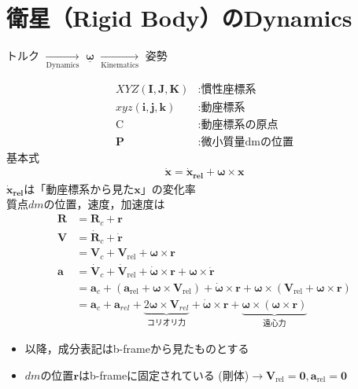 \documentclass[class=article, crop=false, dvipdfmx, fleqn]{standalone}
\begin{document}
\section{衛星（Rigid Body）のDynamics}
\begin{center}
トルク
$\xrightarrow[\text{Dynamics}]{}$
$\underline{\bm{\omega}}$
$\xrightarrow[\text{Kinematics}]{}$
姿勢
\end{center}



\begin{align}
XYZ\left(\bm{I},\bm{J},\bm{K}\right)&:
\text{慣性座標系}\\
xyz\left(\bm{i},\bm{j},\bm{k}\right)&:
\text{動座標系}\\
\text{C}&:
\text{動座標系の原点}\\
\bm{P}&:
\text{微小質量dmの位置}
\end{align}
基本式
\begin{align}
\bm{\dot{x}} = 
\bm{\dot{x}_{rel}} + 
\bm{\omega}\times\bm{x}
\end{align}
$\bm{\dot{x}_{rel}}$は「動座標系から見た$\bm{x}$」の変化率\\
質点$dm$の位置，速度，加速度は
\begin{align}
\bm{R}&=
\bm{R}_c+\bm{r}\\
\bm{V}&=
\dot{\bm{R}}_c+\dot{\bm{r}}\\
&=
\bm{V}_c+\bm{V}_\mathrm{rel}+
\bm{\omega}\times\bm{r}\qquad
\\
\bm{a}
&=
\dot{\bm{V}}_c+
\dot{\bm{V}}_\mathrm{rel}+
\dot{\bm{\omega}}\times\bm{r}+
\bm{\omega}\times\dot{\bm{r}}\\
&=
\bm{a}_c+
\left(
\bm{a}_\mathrm{rel}
+\bm{\omega}\times\bm{V}_\mathrm{rel}
\right)
+\dot{\bm{\omega}}
\times \bm{r}
+\bm{\omega}\times
\left(
\bm{V}_\mathrm{rel}
+\bm{\omega}\times\bm{r}
\right)\\
&=
\bm{a}_c+
\bm{a}_{rel}+
\underbrace{2\bm{\omega}\times\bm{V}_{rel}}
_{\text{コリオリ力}}+
\dot{\bm{\omega}}\times\bm{r}+
\underbrace{\bm{\omega}\times
\left( \bm{\omega} \times 
\bm{r} \right)}_{\text{遠心力}}
\end{align}


\begin{itemize}
\item 以降，成分表記はb-frameから見たものとする
\item $dm$の位置$\bm{r}$はb-frameに固定されている
(剛体)$\rightarrow \bm{V}_\mathrm{rel} = \bm{0}, \bm{a}_\mathrm{rel}
= \bm{0}$
\end{itemize}
\end{document}
